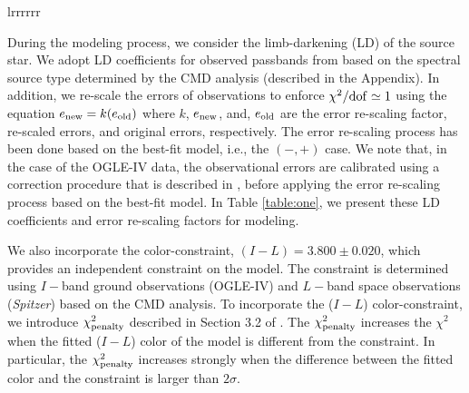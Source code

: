 \documentclass[10pt]{emulateapj}
\begin{document}
\begin{deluxetable*}{lrrrrrr}
\enddata
{}
\end{deluxetable*}


 During the modeling process, we consider the limb-darkening (LD) of the source star. We adopt LD 
coefficients for observed passbands from \citet{claret00} based on the spectral source type determined 
by the CMD analysis (described in the Appendix). In addition, we re-scale the errors of observations 
to enforce $\chi^2/{\rm dof}\simeq 1$ using the equation $e_{\rm new}= k(e_{\rm old})$ where $k$, 
$e_{\rm new}$, and, $e_{\rm old}$ are the error re-scaling factor, re-scaled errors, and original 
errors, respectively. The error re-scaling process has been done based on the best-fit model, i.e., 
the $(-,+)$ case. We note that, in the case of the OGLE-IV data, the observational errors are 
calibrated using a correction procedure that is described in \citet{skowron16}, before applying 
the error re-scaling process based on the best-fit model. In Table \ref{table:one}, we present these 
LD coefficients and error re-scaling factors for modeling.
 
 We also incorporate the color-constraint, $(I-L)=3.800\pm0.020$, which provides an independent 
constraint on the model. The constraint is determined using $I-$band ground observations (OGLE-IV) 
and $L-$band space observations ({\it Spitzer}) based on the CMD analysis. To incorporate the 
($I-L$) color-constraint, we introduce $\chi^2_{\rm penalty}$ described in Section 3.2 of 
\citet{shin17}. The $\chi^2_{\rm penalty}$ increases the $\chi^2$ when the fitted ($I-L$) color 
of the model is different from the constraint. In particular, the $\chi^2_{\rm penalty}$ increases 
strongly when the difference between the fitted color and the constraint is larger than $2\sigma$. 
\end{document}
